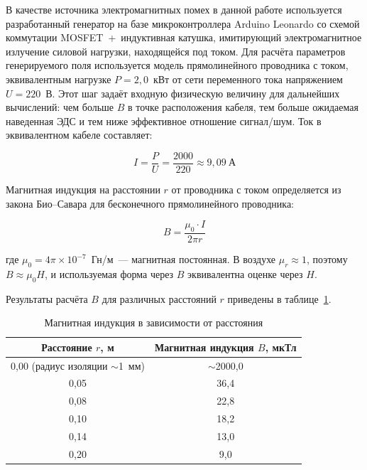 

В качестве источника электромагнитных помех в данной работе
используется разработанный генератор на базе микроконтроллера Arduino Leonardo
со схемой коммутации MOSFET~+~индуктивная катушка, имитирующий
электромагнитное излучение силовой нагрузки, находящейся под током.
Для расчёта параметров генерируемого поля используется модель
прямолинейного проводника с током, эквивалентным нагрузке $P = 2{,}0$~кВт
от сети переменного тока напряжением $U = 220$~В.
Этот шаг задаёт входную физическую величину для дальнейших вычислений:
чем больше $B$ в точке расположения кабеля, тем больше ожидаемая
наведенная ЭДС и тем ниже эффективное отношение сигнал/шум.
Ток в эквивалентном кабеле составляет:

\begin{equation}
  I = \frac{P}{U} = \frac{2000}{220} \approx 9{,}09~\text{А}
\end{equation}

Магнитная индукция на расстоянии $r$ от проводника
с током определяется из закона Био–Савара для бесконечного прямолинейного
проводника:

\begin{equation}
  B = \frac{\mu_0 \cdot I}{2\pi r}
\end{equation}

где $\mu_0 = 4\pi \times 10^{-7}$~Гн/м~--- магнитная постоянная.
В воздухе $\mu_r \approx 1$, поэтому $B \approx \mu_0 H$,
и используемая форма через $B$ эквивалентна оценке через $H$.

Результаты расчёта $B$ для различных расстояний $r$
приведены в таблице~\ref{tab:B_vs_r}.

\begin{table}[H]
  \centering
  \caption{Магнитная индукция в зависимости от расстояния}
  \label{tab:B_vs_r}
  \begin{tabular}{|c|c|}
    \hline
    \textbf{Расстояние $r$, м} & \textbf{Магнитная индукция $B$, мкТл} \\
    \hline
    0{,}00 (радиус изоляции $\sim$1~мм) & $\sim$2000{,}0 \\
    0{,}05            & 36{,}4 \\
    0{,}08            & 22{,}8 \\
    0{,}10            & 18{,}2 \\
    0{,}14            & 13{,}0 \\
    0{,}20            & 9{,}0  \\
    \hline
  \end{tabular}
\end{table}

